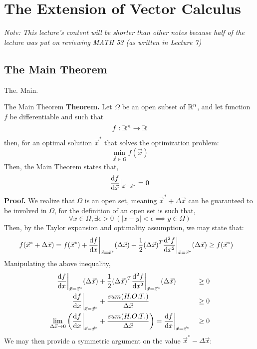 \chapter{The Extension of Vector Calculus}
\textit{Note: This lecture's content will be shorter than other notes because half of the lecture was put on reviewing MATH 53 (as written in Lecture 7)}

\section{The Main Theorem}
The. Main. 
\begin{ln-theorem}{The Main Theorem}{}
    \textbf{Theorem.} Let $\Omega$ be an open subset of $\mathbb{R}^n$, and let function $f$ be differentiable and such that
    \[
        f : \mathbb{R}^n \rightarrow \mathbb{R}
    \]
    then, for an optimal solution $\vec{x}^*$ that solves the optimization problem:
    \[
        \min_{\vec{x} \in \Omega} f(\vec{x})
    \]
    Then, the Main Theorem states that,
    \[
        \dv{f}{\vec{x}} \big|_{\vec{x} = \vec{x}^*} = 0
    \]
    \tcblower
    \textbf{Proof.} 
    We realize that $\Omega$ is an open set, meaning $\vec{x}^* + \Delta \vec{x}$ can be guaranteed to be involved in $\Omega$, for the definition of an open set is such that,
    \[\forall x \in \Omega, \exists \epsilon > 0 \ (|x - y| < \epsilon \implies y \in \Omega)\]
    Then, by the Taylor expansion and optimality assumption, we may state that:
    \begin{align*}
        f(\vec{x}^* + \Delta \vec{x}) &= f(\vec{x}^*) + \dv{f}{x} \bigg|_{\vec{x} = \vec{x}^*} (\Delta \vec{x}) + \frac{1}{2} {(\Delta \vec{x})}^T \dv[2]{f}{x} \bigg|_{\vec{x} = \vec{x}^*} (\Delta \vec{x}) \geq f(\vec{x}^*)
    \end{align*}
    Manipulating the above inequality,
    \begin{align*}
        \dv{f}{x} \bigg|_{\vec{x} = \vec{x}^*} (\Delta \vec{x}) &+ \frac{1}{2} {(\Delta \vec{x})}^T \dv[2]{f}{x} \bigg|_{\vec{x} = \vec{x}^*} (\Delta \vec{x}) &&\geq 0 \\
        \dv{f}{x} \bigg|_{\vec{x} = \vec{x}^*} &+ \frac{sum(H.O.T.)}{\Delta \vec{x}} &&\geq 0 \\
        \lim_{\Delta \vec{x} \rightarrow 0} \bigg( \dv{f}{x} \bigg|_{\vec{x} = \vec{x}^*} &+ \frac{sum(H.O.T.)}{\Delta \vec{x}} \bigg) = \dv{f}{x} \bigg|_{\vec{x} = \vec{x}^*} &&\geq 0
    \end{align*}
    We may then provide a symmetric argument on the value $\vec{x}^* - \Delta \vec{x}$:
    \begin{align*}

\end{align*}
\end{ln-theorem}
